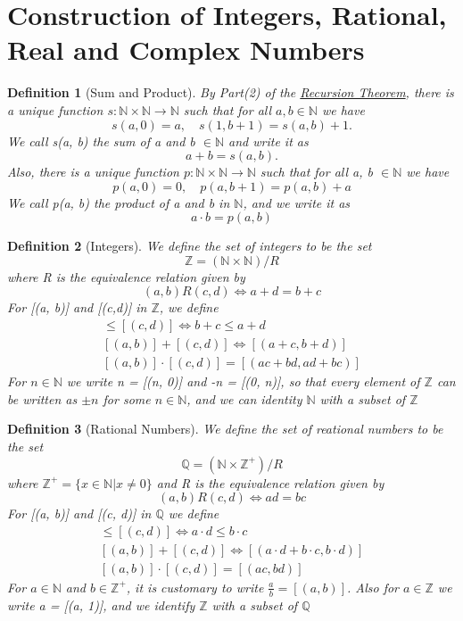 \documentclass[11pt, oneside]{book}
\theoremstyle{break}
\newtheorem{defn}{Definition}[section]
\newcommand{\bb}[1]{\mathbb{#1}}		%
\begin{document}
\section{Construction of Integers, Rational, Real and Complex Numbers}

\begin{defn}[Sum and Product]
	By Part(2) of the \hyperref[recursion_theorem]{Recursion Theorem}, there is a unique function $s: \bb{N} \times \bb{N} \to \bb{N}$ such that for all $a, b \in \bb{N}$ we have
	\[
		s(a, 0) = a, \quad s(1, b + 1) = s(a, b) + 1.
	\]
	We call s(a, b) the sum of a and b $\in \bb{N}$ and write it as
	\[
		a + b = s(a, b).
	\]
	Also, there is a unique function $p: \bb{N} \times \bb{N} \to \bb{N}$ such that for all a, b $\in \bb{N}$ we have
	\[
		p(a, 0) = 0, \quad p(a, b + 1) = p(a, b) + a
	\]
	We call p(a, b) the product of a and b in $\bb{N}$, and we write it as
	\[
		a \cdot b = p(a, b)
	\]
\end{defn}

\begin{defn}[Integers]
	We define the set of integers to be the set
	\[
		\bb{Z} = (\bb{N} \times \bb{N})/R
	\]
	where R is the equivalence relation given by
	\[
		(a, b)R(c,d) \iff a + d = b + c
	\]
	For [(a, b)] and [(c,d)] in $\bb{Z}$, we define
	\begin{gather*}
		[(a, b)] \leq [(c, d)] \iff b + c \leq a + d \\
		[(a, b)] + [(c ,d)] \iff [(a + c, b + d)] \\
		[(a, b)] \cdot [(c, d)] = [(ac + bd, ad + bc)]
	\end{gather*}
	For $n \in \bb{N}$ we write n = [(n, 0)] and -n = [(0, n)], so that every element of $\bb{Z}$ can be written as $\pm n$ for some $n \in \bb{N}$, and we can identity $\bb{N}$ with a subset of $\bb{Z}$
\end{defn}

\begin{defn}[Rational Numbers]
	We define the set of reational numbers to be the set
	\[
		\bb{Q} = (\bb{N} \times \bb{Z}^+)/R
	\]
	where $\bb{Z}^+ = \{x \in \bb{N} | x \neq 0\}$ and R is the equivalence relation given by
	\[
		(a, b)R(c, d) \iff ad = bc
	\]
	For [(a, b)] and [(c, d)] in $\bb{Q}$ we define
	\begin{gather*}
		[(a, b)] \leq [(c, d)] \iff a \cdot d \leq b \cdot c \\
		[(a, b)] + [(c ,d)] \iff [(a \cdot d + b \cdot c, b \cdot d)] \\
		[(a, b)] \cdot [(c, d)] = [(ac, bd)]
	\end{gather*}
	For $a \in \bb{N}$ and $b \in \bb{Z}^+$, it is customary to write $\frac{a}{b} = [(a, b)]$. Also for $a \in \bb{Z}$ we write a = [(a, 1)], and we identify $\bb{Z}$ with a subset of $\bb{Q}$
\end{defn}
\end{document}
